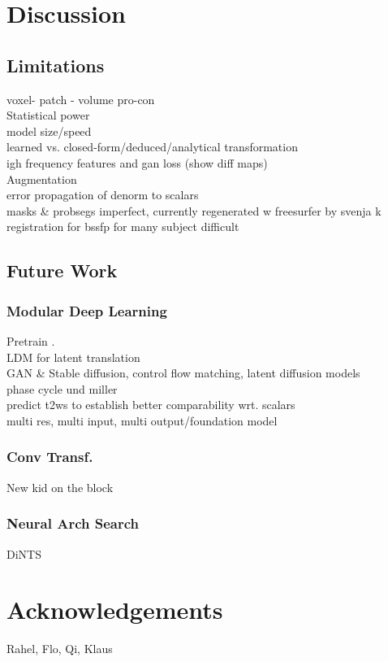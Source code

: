 \chapter{Discussion}\label{\positionnumber}

\section{Limitations}
voxel- patch - volume pro-con\\
Statistical power \\
model size/speed \\
learned vs. closed-form/deduced/analytical transformation \\
igh frequency features and gan loss (show diff maps) \\
Augmentation \\
error propagation of denorm to scalars \\
masks \& probsegs imperfect, currently regenerated w freesurfer by svenja k \\
registration for bssfp for many subject difficult \\

\section{Future Work}
\subsection{Modular Deep Learning}
Pretrain .\\
LDM for latent translation\\
GAN \& Stable diffusion, control flow matching, latent diffusion models\\
phase cycle und miller \\
predict t2ws to establish better comparability wrt. scalars \\
multi res, multi input, multi output/foundation model \\

\subsection{Conv Transf.}
New kid on the block\\

\subsection{Neural Arch Search}
DiNTS

\chapter{Acknowledgements}
Rahel, Flo, Qi, Klaus
